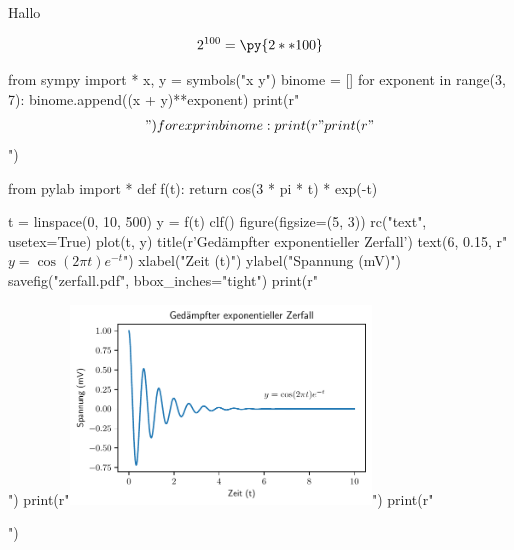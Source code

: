 \documentclass[12pt,ngerman]{scrartcl}
\begin{document}
Hallo


\[
2^{100}=\py{2**100}
\]


\begin{pycode}
from sympy import *
x, y = symbols("x y")
binome = []
for exponent in range(3, 7):
    binome.append((x + y)**exponent)
    print(r"\begin{align*}")
    for expr in binome:
        print(r"%
    print(r"\end{align*}")
\end{pycode}

\begin{pycode}
from pylab import *
def f(t):
    return cos(3 * pi * t) * exp(-t)

t = linspace(0, 10, 500)
y = f(t)
clf()
figure(figsize=(5, 3))
rc("text", usetex=True)
plot(t, y)
title(r'Ged\"ampfter exponentieller Zerfall') 
text(6, 0.15, r"$y = \cos(2 \pi t) e^{-t}$")
xlabel("Zeit (t)")
ylabel("Spannung (mV)")
savefig("zerfall.pdf", bbox_inches="tight")
print(r"\begin{center}")
print(r"\includegraphics[width=0.6\textwidth]{zerfall.pdf}")
print(r"\end{center}")
\end{pycode}
\end{document}
